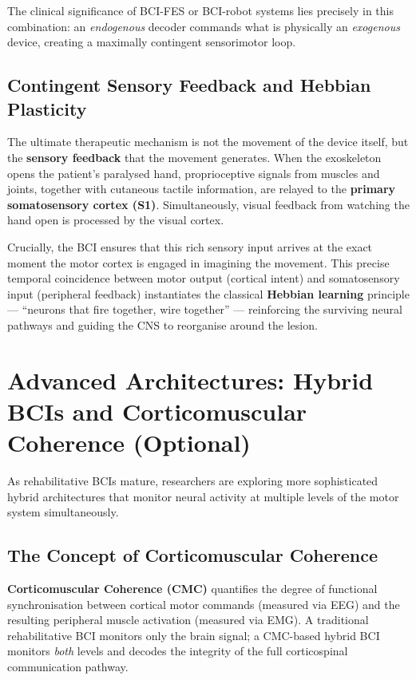 \documentclass[10pt, letterpaper]{report}
\begin{document}
The clinical significance of BCI-FES or BCI-robot systems lies precisely in this
combination: an \emph{endogenous} decoder commands what is physically an
\emph{exogenous} device, creating a maximally contingent sensorimotor loop.

\subsection{Contingent Sensory Feedback and Hebbian Plasticity}

The ultimate therapeutic mechanism is not the movement of the device itself, but the
\textbf{sensory feedback} that the movement generates. When the exoskeleton opens the
patient's paralysed hand, proprioceptive signals from muscles and joints, together with
cutaneous tactile information, are relayed to the \textbf{primary somatosensory cortex
(S1)}. Simultaneously, visual feedback from watching the hand open is processed by the
visual cortex.

Crucially, the BCI ensures that this rich sensory input arrives at the exact moment the
motor cortex is engaged in imagining the movement. This precise temporal coincidence
between motor output (cortical intent) and somatosensory input (peripheral feedback)
instantiates the classical \textbf{Hebbian learning} principle — ``neurons that fire together,
wire together'' — reinforcing the surviving neural pathways and guiding the CNS to
reorganise around the lesion.

\section{Advanced Architectures: Hybrid BCIs and Corticomuscular Coherence \textnormal{\small(Optional)}}

As rehabilitative BCIs mature, researchers are exploring more sophisticated hybrid
architectures that monitor neural activity at multiple levels of the motor system
simultaneously.

\subsection{The Concept of Corticomuscular Coherence}

\textbf{Corticomuscular Coherence (CMC)} quantifies the degree of functional
synchronisation between cortical motor commands (measured via EEG) and the resulting
peripheral muscle activation (measured via EMG). A traditional rehabilitative BCI monitors
only the brain signal; a CMC-based hybrid BCI monitors \emph{both} levels and decodes the
integrity of the full corticospinal communication pathway.
\end{document}
